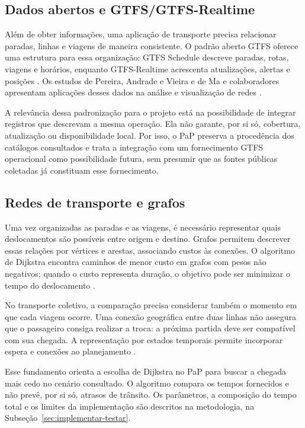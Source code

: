 \documentclass[12pt,oneside,a4paper,brazil]{abntex2}
\begin{document}
\subsection{Dados abertos e GTFS/GTFS-Realtime}
Além de obter informações, uma aplicação de transporte precisa relacionar paradas, linhas e viagens de maneira consistente. O padrão aberto GTFS oferece uma estrutura para essa organização: GTFS Schedule descreve paradas, rotas, viagens e horários, enquanto GTFS-Realtime acrescenta atualizações, alertas e posições \citep{gtfs}. Os estudos de Pereira, Andrade e Vieira e de Ma e colaboradores apresentam aplicações desses dados na análise e visualização de redes \citep{pereira2023,ma2020}.

A relevância dessa padronização para o projeto está na possibilidade de integrar registros que descrevam a mesma operação. Ela não garante, por si só, cobertura, atualização ou disponibilidade local. Por isso, o PaP preserva a procedência dos catálogos consultados e trata a integração com um fornecimento GTFS operacional como possibilidade futura, sem presumir que as fontes públicas coletadas já constituam esse fornecimento.

\subsection{Redes de transporte e grafos}
Uma vez organizadas as paradas e as viagens, é necessário representar quais deslocamentos são possíveis entre origem e destino. Grafos permitem descrever essas relações por vértices e arestas, associando custos às conexões. O algoritmo de Dijkstra encontra caminhos de menor custo em grafos com pesos não negativos; quando o custo representa duração, o objetivo pode ser minimizar o tempo do deslocamento \citep{sedgewicksp}.

No transporte coletivo, a comparação precisa considerar também o momento em que cada viagem ocorre. Uma conexão geográfica entre duas linhas não assegura que o passageiro consiga realizar a troca: a próxima partida deve ser compatível com sua chegada. A representação por estados temporais permite incorporar espera e conexões ao planejamento \citep{transitplanner}.

Esse fundamento orienta a escolha de Dijkstra no PaP para buscar a chegada mais cedo no cenário consultado. O algoritmo compara os tempos fornecidos e não prevê, por si só, atrasos de trânsito. Os parâmetros, a composição do tempo total e os limites da implementação são descritos na metodologia, na Subseção~\ref{sec:implementar-testar}.
\end{document}
